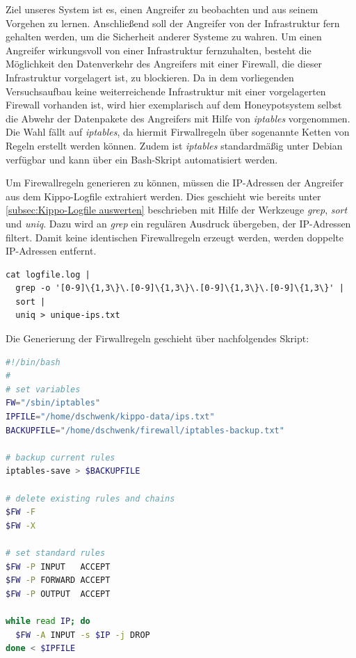 Ziel unseres System ist es, einen Angreifer zu beobachten und aus seinem Vorgehen zu lernen. Anschließend soll der Angreifer von der Infrastruktur fern gehalten werden, um die Sicherheit anderer Systeme zu wahren. Um einen Angreifer wirkungsvoll von einer Infrastruktur fernzuhalten, besteht die Möglichkeit den Datenverkehr des Angreifers mit einer Firewall, die dieser Infrastruktur vorgelagert ist, zu blockieren. Da in dem vorliegenden Versuchsaufbau keine weiterreichende Infrastruktur mit einer vorgelagerten Firewall vorhanden ist, wird hier exemplarisch auf dem Honeypotsystem selbst die Abwehr der Datenpakete des Angreifers mit Hilfe von \textit{iptables} vorgenommen. Die Wahl fällt auf \textit{iptables}, da hiermit Firwallregeln über sogenannte Ketten von Regeln erstellt werden können. Zudem ist \textit{iptables} standardmäßig unter Debian verfügbar und kann über ein Bash-Skript automatisiert werden. 

Um Firewallregeln generieren zu können, müssen die IP-Adressen der Angreifer aus dem Kippo-Logfile extrahiert werden. Dies geschieht wie bereits unter \ref{subsec:Kippo-Logfile auswerten} beschrieben mit Hilfe der Werkzeuge \textit{grep}, \textit{sort} und \textit{uniq}. Dazu wird an \textit{grep} ein regulären Ausdruck übergeben, der IP-Adressen filtert. Damit keine identischen Firewallregeln erzeugt werden, werden doppelte IP-Adressen entfernt.

\begin{lstlisting}[style=customc]
cat logfile.log | 
  grep -o '[0-9]\{1,3\}\.[0-9]\{1,3\}\.[0-9]\{1,3\}\.[0-9]\{1,3\}' |
  sort |
  uniq > unique-ips.txt
\end{lstlisting}

Die Generierung der Firwallregeln geschieht über nachfolgendes Skript:

\begin{lstlisting}[language=bash,style=customccolor]
#!/bin/bash
#
# set variables
FW="/sbin/iptables"
IPFILE="/home/dschwenk/kippo-data/ips.txt"
BACKUPFILE="/home/dschwenk/firewall/iptables-backup.txt"

# backup current rules
iptables-save > $BACKUPFILE

# delete existing rules and chains
$FW -F
$FW -X

# set standard rules
$FW -P INPUT   ACCEPT
$FW -P FORWARD ACCEPT
$FW -P OUTPUT  ACCEPT

while read IP; do
  $FW -A INPUT -s $IP -j DROP
done < $IPFILE


\end{lstlisting}

